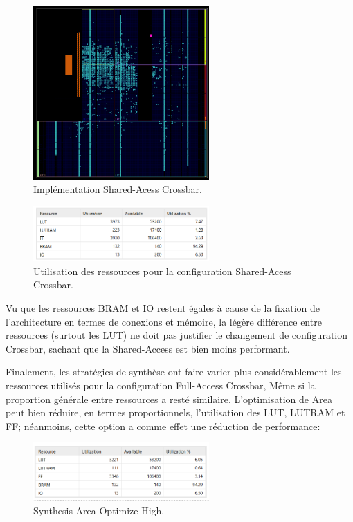 \documentclass[../CSC_5RO07_TA.tex]{subfiles}
\begin{document}
\begin{figure}[H]
    \centering
    \includegraphics[width=0.6\textwidth]{./images/perfNetDelLow_shared_imp.png}
    \caption{Implémentation Shared-Acess Crossbar.}
\end{figure}

\begin{figure}[H]
    \centering
    \includegraphics[width=0.6\textwidth]{./images/perfNetDelLow_shared_uti.png}
    \caption{Utilisation des ressources pour la configuration Shared-Acess Crossbar.}
\end{figure}

Vu que les ressources BRAM et IO restent égales à cause de la fixation de l'architecture en termes de conexions et mémoire, la légère différence entre ressources (surtout les LUT) ne doit pas justifier le changement de configuration Crossbar, sachant que la Shared-Access est bien moins performant.

Finalement, les stratégies de synthèse ont faire varier plus considérablement les ressources utilisés pour la configuration Full-Access Crossbar, Même si la proportion générale entre ressources a resté similaire. L'optimisation de Area peut bien réduire, en termes proportionnels, l'utilisation des LUT, LUTRAM et FF; néanmoins, cette option a comme effet une réduction de performance:

\begin{figure}[H]
    \centering
    \includegraphics[width=0.6\textwidth]{./images/area optimize high.png}
    \caption{Synthesis Area Optimize High.}
\end{figure}
\end{document}
